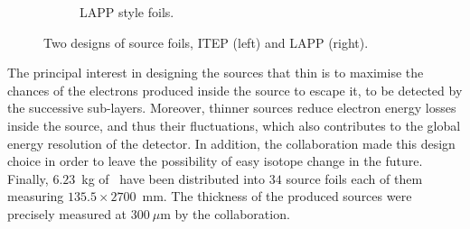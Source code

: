 \begin{figure}[h!]
\begin{subfigure}[t]{0.49\textwidth}
\captionsetup{justification=centering}
\caption{LAPP style foils.
\label{subfig:LAPP_foils}}
\end{subfigure}
\caption{Two designs of source foils, ITEP (left) and LAPP (right).
\label{fig:foils_design}}
\end{figure}
The principal interest in designing the sources that thin is to maximise the chances of the electrons produced inside the source to escape it, to be detected by the successive sub-layers.
Moreover, thinner sources reduce electron energy losses inside the source, and thus their fluctuations, which also contributes to the global energy resolution of the detector.
In addition, the collaboration made this design choice in order to leave the possibility of easy isotope change in the future.
Finally, $6.23$~kg of \Se\ have been distributed into $34$ source foils each of them measuring $135.5\times2700$~mm.
The thickness of the produced sources were precisely measured at $300~\mu$m by the collaboration.

